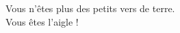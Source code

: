 \clearpage
\vspace*{\fill}
\begin{center}
\begin{minipage}{.6\textwidth}
Vous n'êtes plus des petits vers de terre. \\
Vous êtes l'aigle !
\end{minipage}
\end{center}
\vfill %
\clearpage